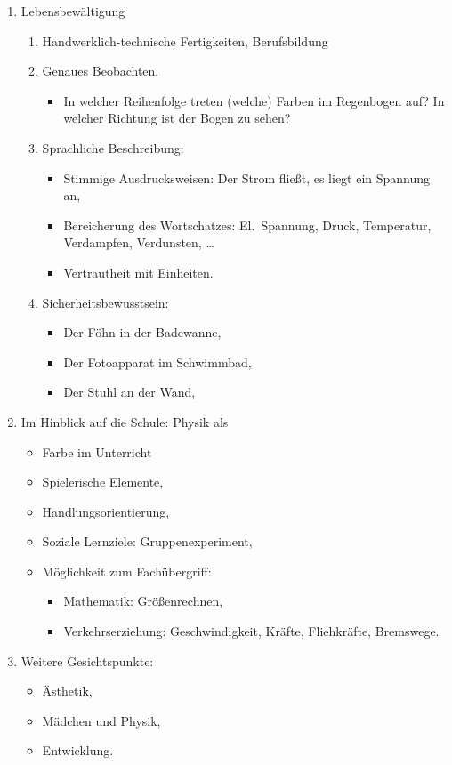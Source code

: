\begin{enumerate}
	\item Lebensbew\"{a}ltigung

	\begin{enumerate}

		\item Handwerklich-technische Fertigkeiten, Berufsbildung
		\item Genaues Beobachten.

		\begin{itemize}
			\item In welcher Reihenfolge treten (welche) Farben im Regenbogen auf? In welcher Richtung ist der Bogen zu sehen?
		\end{itemize}


		\item Sprachliche Beschreibung:
		\begin{itemize}
			\item Stimmige Ausdrucksweisen: Der Strom flie{\ss}t, es liegt ein Spannung an,
			\item Bereicherung des Wortschatzes: El.\ Spannung, Druck, Temperatur, Verdampfen, Verdunsten, \dots
			\item Vertrautheit mit Einheiten.
		\end{itemize}

		\item Sicherheitsbewusstsein:
		\begin{itemize}
			\item Der F\"{o}hn in der Badewanne,
			\item Der Fotoapparat im Schwimmbad,
			\item Der Stuhl an der Wand,
		\end{itemize}

	\end{enumerate}

	\item Im Hinblick auf die Schule: Physik als 

	\begin{itemize}
		\item Farbe im Unterricht
		\item Spielerische Elemente,
		\item Handlungsorientierung,
		\item Soziale Lernziele: Gruppenexperiment,
		\item M\"{o}glichkeit zum Fach\"{u}bergriff:
		\begin{itemize}
			\item Mathematik: Gr\"{o}{\ss}enrechnen,
			\item Verkehrserziehung: Geschwindigkeit, Kr\"{a}fte, Fliehkr\"{a}fte, Bremswege.
		\end{itemize}

	\end{itemize}

	\item Weitere Gesichtspunkte:
	\begin{itemize}
		\item \"{A}sthetik,
		\item M\"{a}dchen und Physik,
		\item Entwicklung.
	\end{itemize}

\end{enumerate}